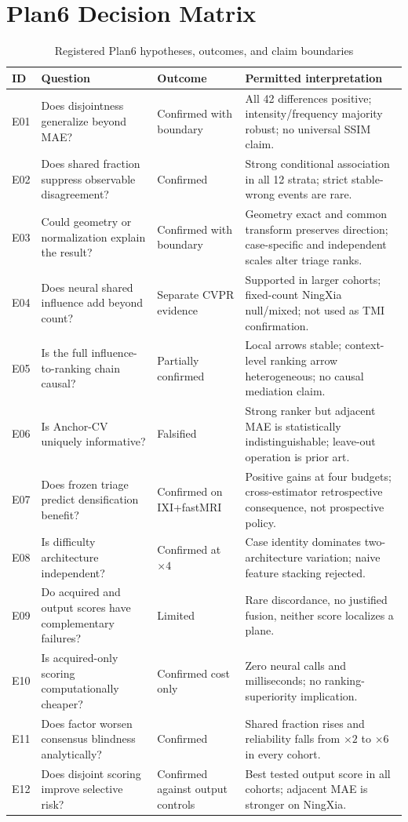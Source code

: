 \documentclass[journal,10pt]{IEEEtran}
\begin{document}
\section{Plan6 Decision Matrix}
\begin{table}[t]
\caption{Registered Plan6 hypotheses, outcomes, and claim boundaries}
\label{tab:decision}\centering
\begin{tabular}{p{.65cm}p{3.1cm}p{2.0cm}p{9.0cm}}
\toprule
ID&Question&Outcome&Permitted interpretation\\
\midrule
E01&Does disjointness generalize beyond MAE?&Confirmed with boundary&All 42 differences positive; intensity/frequency majority robust; no universal SSIM claim.\\
E02&Does shared fraction suppress observable disagreement?&Confirmed&Strong conditional association in all 12 strata; strict stable-wrong events are rare.\\
E03&Could geometry or normalization explain the result?&Confirmed with boundary&Geometry exact and common transform preserves direction; case-specific and independent scales alter triage ranks.\\
E04&Does neural shared influence add beyond count?&Separate CVPR evidence&Supported in larger cohorts; fixed-count NingXia null/mixed; not used as TMI confirmation.\\
E05&Is the full influence-to-ranking chain causal?&Partially confirmed&Local arrows stable; context-level ranking arrow heterogeneous; no causal mediation claim.\\
E06&Is Anchor-CV uniquely informative?&Falsified&Strong ranker but adjacent MAE is statistically indistinguishable; leave-out operation is prior art.\\
E07&Does frozen triage predict densification benefit?&Confirmed on IXI+fastMRI&Positive gains at four budgets; cross-estimator retrospective consequence, not prospective policy.\\
E08&Is difficulty architecture independent?&Confirmed at $\times4$&Case identity dominates two-architecture variation; naive feature stacking rejected.\\
E09&Do acquired and output scores have complementary failures?&Limited&Rare discordance, no justified fusion, neither score localizes a plane.\\
E10&Is acquired-only scoring computationally cheaper?&Confirmed cost only&Zero neural calls and milliseconds; no ranking-superiority implication.\\
E11&Does factor worsen consensus blindness analytically?&Confirmed&Shared fraction rises and reliability falls from $\times2$ to $\times6$ in every cohort.\\
E12&Does disjoint scoring improve selective risk?&Confirmed against output controls&Best tested output score in all cohorts; adjacent MAE is stronger on NingXia.\\
\bottomrule
\end{tabular}
\end{table}
\end{document}
